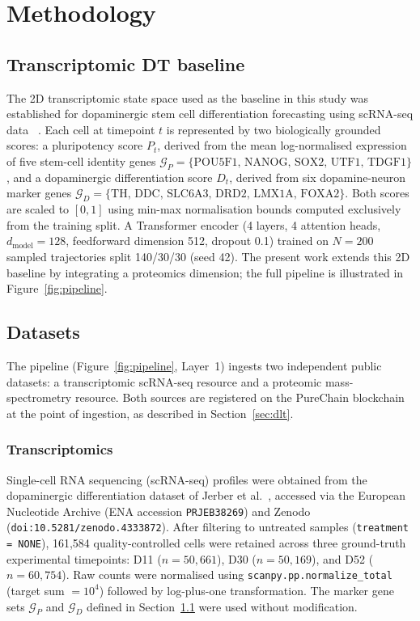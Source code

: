 \documentclass[5p,times,twocolumn]{elsarticle}
\begin{document}
\section{Methodology}

\subsection{\textbf{Transcriptomic DT baseline}}
\label{sec:baseline}

The 2D transcriptomic state space used as
the baseline in this study was established for dopaminergic
stem cell differentiation forecasting using scRNA-seq data ~\cite{kanu2026transformer}.
Each cell at timepoint $t$ is represented by two biologically
grounded scores: a pluripotency score $P_{t}$, derived from
the mean log-normalised expression of five stem-cell identity
genes
$\mathcal{G}_{P} = \{\text{POU5F1, NANOG, SOX2, UTF1, TDGF1}\}$,
and a dopaminergic differentiation score $D_{t}$, derived
from six dopamine-neuron marker genes
$\mathcal{G}_{D} = \{\text{TH, DDC, SLC6A3, DRD2, LMX1A, FOXA2}\}$.
Both scores are scaled to $[0,1]$ using min-max normalisation
bounds computed exclusively from the training split.
A Transformer encoder (4 layers, 4 attention heads,
$d_{\text{model}} = 128$, feedforward dimension 512,
dropout 0.1) trained on $N = 200$ sampled trajectories
split 140/30/30 (seed 42).
The present work extends this 2D baseline by integrating
a proteomics dimension; the full pipeline is illustrated
in Figure~\ref{fig:pipeline}.

\subsection{\textbf{Datasets}}
\label{sec:datasets}

The pipeline (Figure~\ref{fig:pipeline}, Layer~1) ingests two
independent public datasets: a transcriptomic scRNA-seq
resource and a proteomic mass-spectrometry resource.
Both sources are registered on the PureChain blockchain at
the point of ingestion, as described in
Section~\ref{sec:dlt}.

\subsubsection{Transcriptomics}
Single-cell RNA sequencing (scRNA-seq) profiles were obtained
from the dopaminergic differentiation dataset of
Jerber et al.~\cite{jerber2021population}, accessed via the
European Nucleotide Archive (ENA accession \texttt{PRJEB38269})
and Zenodo (\texttt{doi:10.5281/zenodo.4333872}).
After filtering to untreated samples (\texttt{treatment = NONE}),
161,584 quality-controlled cells were retained across three
ground-truth experimental timepoints: D11 ($n = 50{,}661$),
D30 ($n = 50{,}169$), and D52 ($n = 60{,}754$).
Raw counts were normalised using
\texttt{scanpy.pp.normalize\_total} (target sum $= 10^{4}$)
followed by log-plus-one transformation.
The marker gene sets $\mathcal{G}_{P}$ and $\mathcal{G}_{D}$
defined in Section~\ref{sec:baseline} were used without
modification.
\end{document}
